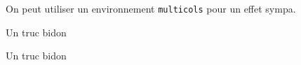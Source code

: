 \medskip


On peut utiliser un environnement \verb+multicols+ pour un effet sympa.

\begin{multicols}{2}    
\begin{algo}
    \caption{Un truc bidon}

\end{algo} 
\begin{algo}
    \caption{Un truc bidon}

\end{algo}
\end{multicols}



